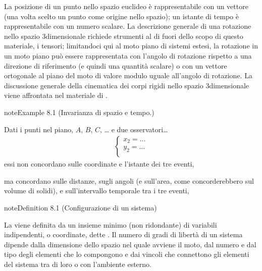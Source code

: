 \documentclass[letterpaper,10pt,italian]{jupyterBook}
\begin{document}
\sphinxAtStartPar
La posizione di un punto nello spazio euclideo è rappresentabile con un vettore (una volta scelto un punto come origine nello spazio); un istante di tempo è rappresentabile con un numero scalare. La descrizione generale di una rotazione nello spazio 3\sphinxhyphen{}dimensionale richiede strumenti al di fuori dello scopo di questo materiale, i tensori; limitandoci qui al moto piano di sistemi estesi, la rotazione in un moto piano può essere rappresentata con l’angolo di rotazione rispetto a una direzione di riferimento (e quindi una quantità scalare) o con un vettore ortogonale al piano del moto di valore modulo uguale all’angolo di rotazione. La discussione generale della cinematica dei corpi rigidi nello spazio 3\sphinxhyphen{}dimensionale viene affrontata nel materiale di .
\label{ch/mechanics/kinematics:invariance-space-and-time}
\begin{sphinxadmonition}{note}{Example 8.1 (Invarianza di spazio e tempo.)}



\sphinxAtStartPar
Dati i punti nel piano, \(A\), \(B\), \(C\), … e due osservatori…
\begin{equation*}
\begin{split}\begin{cases}
x_2 = \dots \\
y_2 = \dots \\
\end{cases}\end{split}
\end{equation*}
\sphinxAtStartPar
essi non concordano sulle coordinate e l’istante dei tre eventi,

\sphinxAtStartPar
ma concordano sulle distanze, sugli angoli (e sull’area, come concorderebbero sul volume di solidi), e sull’intervallo temporale tra i tre eventi,
\end{sphinxadmonition}
\label{ch/mechanics/kinematics:system-configuration}
\begin{sphinxadmonition}{note}{Definition 8.1 (Configurazione di un sistema)}



\sphinxAtStartPar
La  viene definita da un insieme minimo (non ridondante) di variabili indipendenti, o coordinate, dette .  Il numero di gradi di libertà di un sistema dipende dalla dimensione dello spazio nel quale avviene il moto, dal numero e dal tipo degli elementi che lo compongono e dai vincoli che connettono gli elementi del sistema tra di loro o con l’ambiente esterno.
\end{sphinxadmonition}
\end{document}
